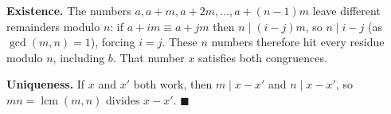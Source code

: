 \textbf{Existence.} The numbers $a,a+m,a+2m,\dots,a+(n-1)m$ leave different remainders modulo $n$: if $a+im\equiv a+jm$ then $n\mid(i-j)m$, so $n\mid i-j$ (as $\gcd(m,n)=1$), forcing $i=j$. These $n$ numbers therefore hit every residue modulo $n$, including $b$. That number $x$ satisfies both congruences.

\textbf{Uniqueness.} If $x$ and $x'$ both work, then $m\mid x-x'$ and $n\mid x-x'$, so $mn=\operatorname{lcm}(m,n)$ divides $x-x'$. $\blacksquare$

